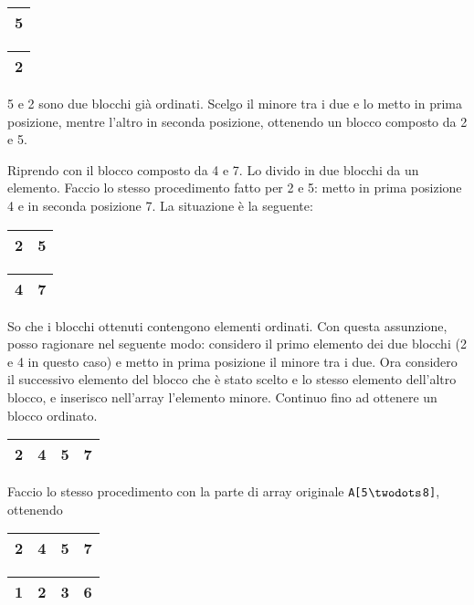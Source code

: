 \begin{center}
	\begin{tabular}{|l|}
		\hline
		5 \\
		\hline
	\end{tabular}
	\hspace{1cm}
	\begin{tabular}{|l|}
		\hline
		2 \\
		\hline
	\end{tabular}
\end{center}

5 e 2 sono due blocchi già ordinati. Scelgo il minore tra i due e lo metto in prima 
posizione, mentre l'altro in seconda posizione, ottenendo un blocco composto da 2 e 5.\par
Riprendo con il blocco composto da 4 e 7. Lo divido in due blocchi da un elemento. Faccio lo stesso procedimento 
fatto per 2 e 5: metto in prima posizione 4 e in seconda posizione 7. La situazione
è la seguente:

\begin{center}
	\begin{tabular}{|l|l|}
		\hline
		2 & 5 \\
		\hline
	\end{tabular}
	\hspace{1cm}
	\begin{tabular}{|l|l|}
		\hline
		4 & 7 \\
		\hline
	\end{tabular}
\end{center}

So che i blocchi ottenuti contengono elementi ordinati. Con questa assunzione, posso ragionare 
nel seguente modo: considero il primo elemento dei due blocchi (2 e 4 in questo caso) e metto 
in prima posizione il minore tra i due. Ora considero il successivo elemento del blocco che è stato scelto e lo stesso elemento dell'altro blocco, e inserisco nell'array l'elemento minore. Continuo fino ad 
ottenere un blocco ordinato.

\begin{center}
	\begin{tabular}{|l|l|l|l|}
		\hline
		2 & 4 & 5 & 7 \\
		\hline
	\end{tabular}
\end{center}

Faccio lo stesso procedimento con la parte di array originale \texttt{A[5$\twodots$8]}, ottenendo

\begin{center}
	\begin{tabular}{|l|l|l|l|}
		\hline
		2 & 4 & 5 & 7 \\
		\hline
	\end{tabular}
	\hspace{1cm}
	\begin{tabular}{|l|l|l|l|}
		\hline
		1 & 2 & 3 & 6 \\
		\hline
	\end{tabular}
\end{center}


